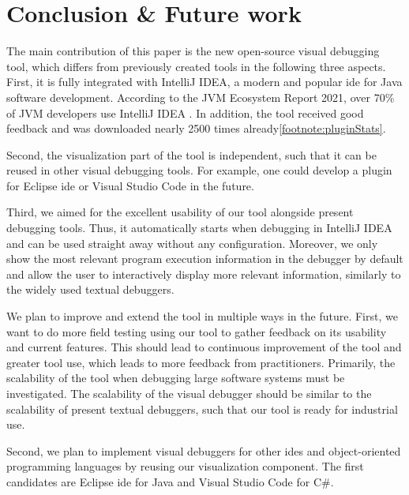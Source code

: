 \documentclass[conference]{IEEEtran}
\newcommand{\intellij}{IntelliJ IDEA}
\begin{document}
\section{Conclusion \& Future work} \label{sec:conclusion}
The main contribution of this paper is the new open-source visual debugging tool, which differs from previously created tools in the following three aspects.
First, it is fully integrated with \intellij{}, a modern and popular \gls*{ide} for Java software development.
According to the JVM Ecosystem Report 2021, over 70\% of JVM developers use \intellij{}  \cite{JVMEcosystemReport2021}.
In addition, the tool received good feedback and was downloaded nearly 2500 times already\cref{footnote:pluginStats}.

Second, the visualization part of the tool is independent, such that it can be reused in other visual debugging tools.
For example, one could develop a plugin for Eclipse \gls*{ide} or Visual Studio Code in the future.

Third, we aimed for the excellent usability of our tool alongside present debugging tools.
Thus, it automatically starts when debugging in \intellij{} and can be used straight away without any configuration.
Moreover, we only show the most relevant program execution information in the debugger by default and allow the user to interactively display more relevant information, similarly to the widely used textual debuggers.

We plan to improve and extend the tool in multiple ways in the future.
First, we want to do more field testing using our tool to gather feedback on its usability and current features.
This should lead to continuous improvement of the tool and greater tool use, which leads to more feedback from practitioners. 
Primarily, the scalability of the tool when debugging large software systems must be investigated.
The scalability of the visual debugger should be similar to the scalability of present textual debuggers, such that our tool is ready for industrial use.

Second, we plan to implement visual debuggers for other \glspl*{ide} and object-oriented programming languages by reusing our visualization component.
The first candidates are Eclipse \gls*{ide} for Java and Visual Studio Code for C\#.
\end{document}
